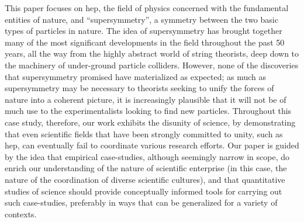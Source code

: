 \documentclass[smallextended]{svjour3}
\begin{document}
This paper focuses on \gls{hep}, the field of physics concerned with the fundamental entities of nature, and ``supersymmetry'', a symmetry between the two basic types of particles in nature. The idea of supersymmetry has brought together many of the most significant developments in the field throughout the past 50 years, all the way from the highly abstract world of string theorists, deep down to the machinery of under-ground particle colliders. However, none of the discoveries that supersymmetry promised have materialized as expected; as much as supersymmetry may be necessary to theorists seeking to unify the forces of nature into a coherent picture, it is increasingly plausible that it will not be of much use to the experimentalists looking to find new particles. Throughout this case study, therefore, our work exhibits the disunity of science, by demonstrating that even scientific fields that have been strongly committed to unity, such as \gls{hep}, can eventually fail to coordinate various research efforts. Our paper is guided by the idea that empirical case-studies, although seemingly narrow in scope, do enrich our understanding of the nature of scientific enterprise (in this case, the nature of the coordination of diverse scientific cultures), and that quantitative studies of science should provide conceptually informed tools for carrying out such case-studies, preferably in ways that can be generalized for a variety of contexts. %
\end{document}
